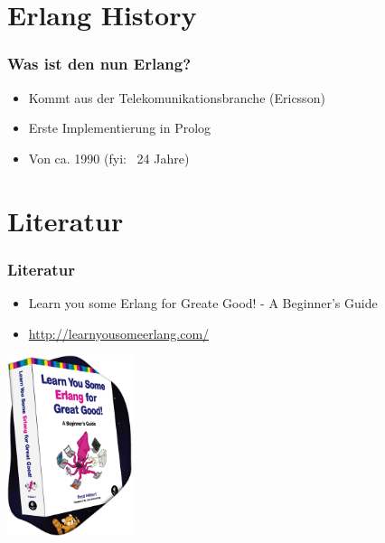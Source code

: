 \section{Erlang History}
\begin{frame} %
  \frametitle{Was ist den nun Erlang?} %
  \begin{itemize} %
    \item Kommt aus der Telekomunikationsbranche (Ericsson)
    \item Erste Implementierung in Prolog
    \item Von ca. 1990 (fyi: ~24 Jahre)
  \end{itemize}
\end{frame}

\section{Literatur}
\begin{frame} %
  \frametitle{Literatur} %
  \begin{itemize} %
    \item Learn you some Erlang for Greate Good! - A Beginner's Guide
    \item \url{http://learnyousomeerlang.com/}
  \end{itemize}
  \includegraphics[height=200px]{img/splash-book}
\end{frame}

